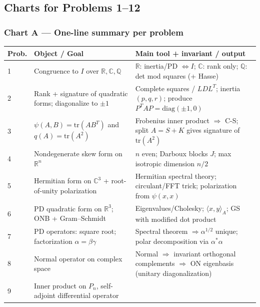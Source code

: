 \documentclass[12pt,a4paper]{article}
\theoremstyle{plain}
\theoremstyle{definition}      %
\begin{document}

\subsection*{Charts for Problems 1--12}

\subsubsection*{Chart A — One-line summary per problem}

\begin{center}
	\renewcommand{\arraystretch}{1.25}
	\begin{tabular}{@{}p{1.3cm}p{6.2cm}p{6.3cm}@{}}
		\toprule
		\textbf{Prob.} & \textbf{Object / Goal} & \textbf{Main tool + invariant / output} \\
		\midrule
		1 & Congruence to $I$ over $\mathbb R,\mathbb C,\mathbb Q$ &
		$\mathbb R$: inertia/PD $\Leftrightarrow I$; $\mathbb C$: rank only; $\mathbb Q$: det mod squares (+ Hasse) \\
		2 & Rank + signature of quadratic forms; diagonalize to $\pm1$ &
		Complete squares / $LDL^T$; inertia $(p,q,r)$; produce $P^TAP=\mathrm{diag}(\pm1,0)$ \\
		3 & $\psi(A,B)=\mathrm{tr}(AB^T)$ and $q(A)=\mathrm{tr}(A^2)$ &
		Frobenius inner product $\Rightarrow$ C-S; split $A=S+K$ gives signature of $\mathrm{tr}(A^2)$ \\
		4 & Nondegenerate skew form on $\mathbb R^n$ &
		$n$ even; Darboux blocks $J$; max isotropic dimension $n/2$ \\
		5 & Hermitian form on $\mathbb C^3$ + root-of-unity polarization &
		Hermitian spectral theory; circulant/FFT trick; polarization from $\psi(x,x)$ \\
		6 & PD quadratic form on $\mathbb R^3$; ONB + Gram--Schmidt &
		Eigenvalues/Cholesky; $\langle x,y\rangle_A$; GS with modified dot product \\
		7 & PD operators: square root; factorization $\alpha=\beta\gamma$ &
		Spectral theorem $\Rightarrow \alpha^{1/2}$ unique; polar decomposition via $\alpha^*\alpha$ \\
		8 & Normal operator on complex space & Normal $\Rightarrow$ invariant orthogonal complements $\Rightarrow$ ON eigenbasis (unitary diagonalization) \\
		9 & Inner product on $P_n$, self-adjoint differential operator &

\end{tabular}
\end{center}
\end{document}
